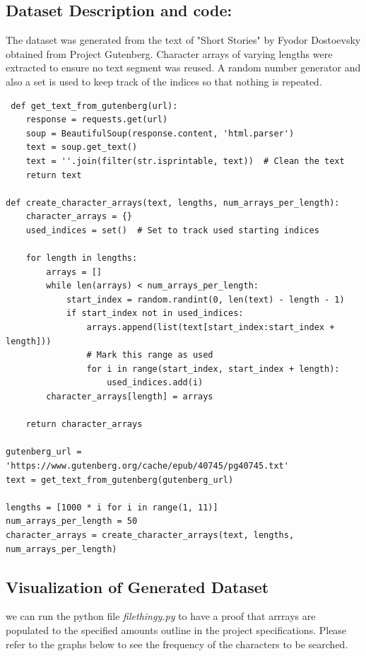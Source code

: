 \documentclass{article}
\begin{document}
\subsection*{Dataset Description and code: }
The dataset was generated from the text of "Short Stories" by Fyodor Dostoevsky obtained from Project Gutenberg. 
Character arrays of varying lengths were extracted to ensure no text segment was reused.
A random number generator and also a set is used to keep track of the indices so that nothing is repeated. 

\begin{verbatim}
 def get_text_from_gutenberg(url):
    response = requests.get(url)
    soup = BeautifulSoup(response.content, 'html.parser')
    text = soup.get_text()
    text = ''.join(filter(str.isprintable, text))  # Clean the text
    return text

def create_character_arrays(text, lengths, num_arrays_per_length):
    character_arrays = {}
    used_indices = set()  # Set to track used starting indices

    for length in lengths:
        arrays = []
        while len(arrays) < num_arrays_per_length:
            start_index = random.randint(0, len(text) - length - 1)
            if start_index not in used_indices:
                arrays.append(list(text[start_index:start_index + length]))
                # Mark this range as used
                for i in range(start_index, start_index + length):
                    used_indices.add(i)
        character_arrays[length] = arrays

    return character_arrays

gutenberg_url = 'https://www.gutenberg.org/cache/epub/40745/pg40745.txt' 
text = get_text_from_gutenberg(gutenberg_url)
    
lengths = [1000 * i for i in range(1, 11)]  
num_arrays_per_length = 50
character_arrays = create_character_arrays(text, lengths, num_arrays_per_length)
\end{verbatim}
\subsection*{Visualization of Generated Dataset}
we can run the python file \emph{filethingy.py} to have a proof that arrrays are populated to the specified amounts outline in the project specifications. 
Please refer to the graphs below to see the frequency of the characters to be searched.
\end{document}
